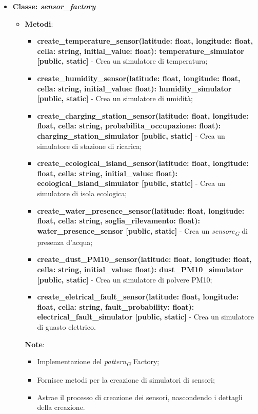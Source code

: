 \begin{itemize}
    \item{\textbf{Classe: \textit{sensor\_factory}}}
    \begin{itemize}
        \item \textbf{Metodi}: 
        \begin{itemize}
            \item \textbf{create\_temperature\_sensor(latitude: float, longitude: float, cella: string, initial\_value: float): temperature\_simulator [public, static]} - Crea un simulatore di temperatura;

            \item \textbf{create\_humidity\_sensor(latitude: float, longitude: float, cella: string, initial\_value: float): humidity\_simulator [public, static]} - Crea un simulatore di umidità;
            
            \item \textbf{create\_charging\_station\_sensor(latitude: float, longitude: float, cella: string, probabilita\_occupazione: float): charging\_station\_simulator [public, static]} - Crea un simulatore di stazione di ricarica;
            
            \item \textbf{create\_ecological\_island\_sensor(latitude: float, longitude: float, cella: string, initial\_value: float): ecological\_island\_simulator [public, static]} - Crea un simulatore di isola ecologica;
            
            \item \textbf{create\_water\_presence\_sensor(latitude: float, longitude: float, cella: string, soglia\_rilevamento: float): water\_presence\_sensor [public, static]} - Crea un \textit{sensore}\textsubscript{\textit{G}} di presenza d'acqua;
            
            \item \textbf{create\_dust\_PM10\_sensor(latitude: float, longitude: float, cella: string, initial\_value: float): dust\_PM10\_simulator [public, static]} - Crea un simulatore di polvere PM10;
            
            \item \textbf{create\_eletrical\_fault\_sensor(latitude: float, longitude: float, cella: string, fault\_probability: float): electrical\_fault\_simulator [public, static]} - Crea un simulatore di guasto elettrico.
        \end{itemize}
    \textbf{Note}:
        \begin{itemize}
            \item Implementazione del \textit{pattern}\textsubscript{\textit{G}} Factory;
            \item Fornisce metodi per la creazione di simulatori di sensori;
            \item Astrae il processo di creazione dei sensori, nascondendo i dettagli della creazione.
        \end{itemize}
    \end{itemize}
\end{itemize}

